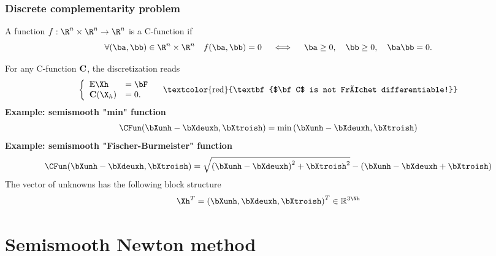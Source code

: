 \documentclass{beamer}
\begin{document}
\begin{frame}
\frametitle{Discrete complementarity problem}
\begin{definition}
A function $f: {{\R}^n \times \R^n} \rightarrow \R^n$ is a C-function if
\begin{equation*}
\forall(\ba,\bb)\in {\R}^n \times \R^n \quad f(\ba,\bb)=0 \quad \iff \quad
\ba \geq0, \quad \bb \geq0, \quad \ba \bb=0.
\end{equation*}
\end{definition}
For any C-function ${\bf C}$, the discretization reads 
\begin{equation*}
\left\lbrace\begin{array}{llccc}
 \mathbb{E}\Xh &= \bF\\
{\bf C}(\X_h)&=0.
\end{array}
\right.
\quad \mbox{\textcolor{red}{\textbf{$\bf C$ is not Fréchet differentiable!}}}
\end{equation*}
\textcolor{cadmiumgreen}{\textbf{ Example: semismooth "min" function}} 
\begin{equation*}
\CFun(\bXunh-\bXdeuxh,\bXtroish) =\min \left(\bXunh-\bXdeuxh, \bXtroish\right)
\end{equation*}
\textcolor{cadmiumgreen}{\textbf{Example: semismooth "Fischer-Burmeister" function}}
\begin{equation*}
\CFun(\bXunh-\bXdeuxh,\bXtroish)=\sqrt{\left(\bXunh-\bXdeuxh\right)^2 + \bXtroish^2} - (\bXunh-\bXdeuxh + \bXtroish)
\end{equation*}
The vector of unknowns has the following block structure
\begin{equation*}
\Xh^{T}=
\left(\bXunh, \bXdeuxh, \bXtroish\right)^{T} \in \mathbb{R}^{3 \Nh}
\end{equation*}
\end{frame}
\section{Semismooth Newton method}
\end{document}
